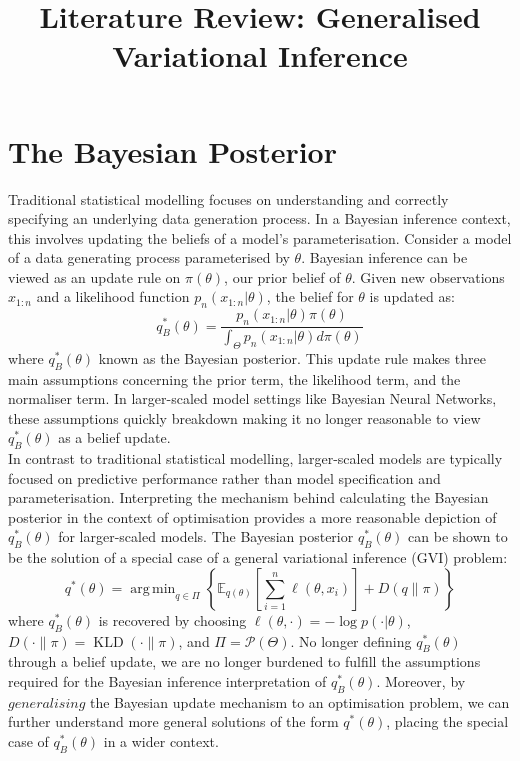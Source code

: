 \documentclass[twoside,11pt]{article}
\newcommand{\KLD}{\operatorname{KLD}}
\DeclareMathOperator*{\argmin}{arg\,min}
\begin{document}
\title{Literature Review: Generalised Variational Inference}
\maketitle
\section{The Bayesian Posterior}\label{sec:bayesian-posterior}
Traditional statistical modelling focuses on understanding and correctly specifying an underlying data generation process. In a Bayesian inference context, this involves updating the beliefs of a model's parameterisation. Consider a model of a data generating process parameterised by $\theta$. Bayesian inference can be viewed as an update rule on $\pi(\theta)$, our prior belief of $\theta$. Given new observations $x_{1:n}$ and a likelihood function $p_n(x_{1:n}|\theta)$, the belief for $\theta$ is updated as:
\[q_B^*(\theta) = \frac{p_n(x_{1:n}|\theta) \pi(\theta)}{\int_{\Theta} p_n(x_{1:n}|\theta) d \pi(\theta)}\]
where $q_B^*(\theta)$ known as the Bayesian posterior. This update rule makes three main assumptions concerning the prior term, the likelihood term, and the normaliser term. In larger-scaled model settings like Bayesian Neural Networks, these assumptions quickly breakdown making it no longer reasonable to view $q_B^*(\theta)$ as a belief update. \\
\newline 
In contrast to traditional statistical modelling, larger-scaled models are typically focused on predictive performance rather than model specification and parameterisation. Interpreting the mechanism behind calculating the Bayesian posterior in the context of optimisation provides a more reasonable depiction of $q_B^*(\theta)$ for larger-scaled models. The Bayesian posterior $q_B^*(\theta)$ can be shown to be the solution of a special case of a general variational inference (GVI) problem:
\[q^*(\theta) = \argmin_{q \in \Pi} \left\{ \mathbb{E}_{q(\theta)}\left[\sum_{i=1}^n \ell(\theta, x_i)\right] + D(q\|\pi)\right\}\]
where $q_B^*(\theta)$ is recovered by choosing $\ell(\theta, \cdot) = -\log p(\cdot | \theta)$, $D(\cdot \| \pi) = \KLD(\cdot \| \pi)$, and $\Pi = \mathcal{P}(\Theta)$. No longer defining $q_B^*(\theta)$ through a belief update, we are no longer burdened to fulfill the assumptions required for the Bayesian inference interpretation of $q_B^*(\theta)$. Moreover, by $\textit{generalising}$ the Bayesian update mechanism to an optimisation problem, we can further understand more general solutions of the form $q^*(\theta)$, placing the special case of $q_B^*(\theta)$ in a wider context.
\end{document}
